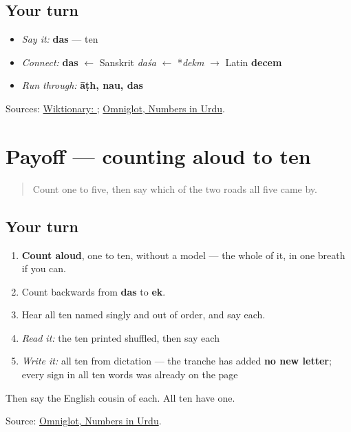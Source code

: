 \subsection*{Your turn}
\begin{itemize}
\raggedright
  \item \emph{Say it:} \textbf{das} — ten
  \item \emph{Connect:} \textbf{das} $\leftarrow$ Sanskrit \emph{daśa} $\leftarrow$ *\emph{dekm} $\to$ Latin \textbf{decem}
  \item \emph{Run through:} \textbf{āṭh, nau, das}
\end{itemize}

\begin{tcolorbox}[breakable,colback=teal!4,colframe=teal!35!black,title={Before you move on}]
Sources: \href{https://en.wiktionary.org/wiki/\%D8\%AF\%D8\%B3}{Wiktionary: }; \href{https://www.omniglot.com/language/numbers/urdu.htm}{Omniglot, Numbers in Urdu}.
\end{tcolorbox}
\section[Practice]{Payoff — counting aloud to ten}

\label{lesson:UR-C29-practice}



\begin{quote}
Count one to five, then say which of the two roads all five came by.
\end{quote}

\subsection*{Your turn}
\begin{enumerate}
\raggedright
  \item \textbf{Count aloud}, one to ten, without a model — the whole of it, in one breath if you can.
  \item Count backwards from \textbf{das} to \textbf{ek}.
  \item Hear all ten named singly and out of order, and say each.
  \item \emph{Read it:} the ten printed shuffled, then say each
  \item \emph{Write it:} all ten from dictation — the tranche has added \textbf{no new letter}; every sign in all ten words was already on the page
\end{enumerate}

Then say the English cousin of each. All ten have one.

\begin{tcolorbox}[breakable,colback=teal!4,colframe=teal!35!black,title={Before you move on}]
Source: \href{https://www.omniglot.com/language/numbers/urdu.htm}{Omniglot, Numbers in Urdu}.
\end{tcolorbox}
